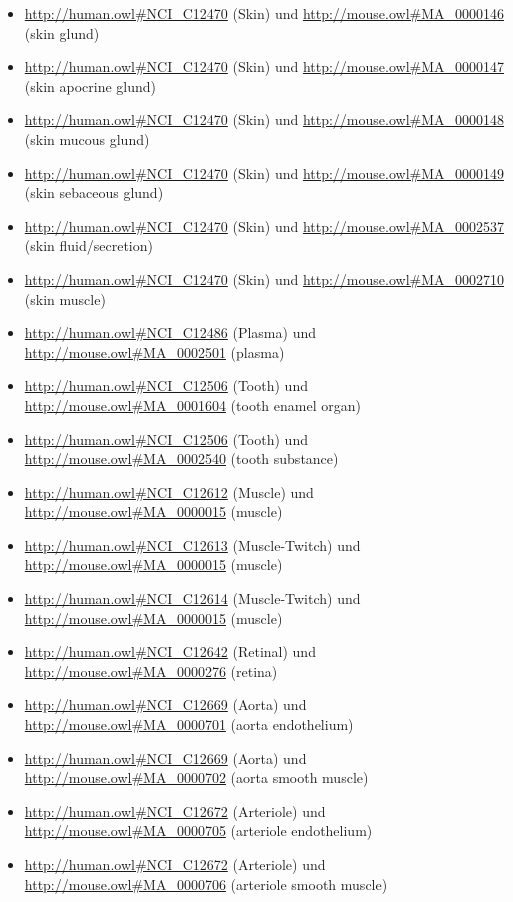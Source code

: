 \begin{itemize}
	\item \url{http://human.owl#NCI_C12470} (Skin) und \url{http://mouse.owl#MA_0000146} (skin glund)
	\item \url{http://human.owl#NCI_C12470} (Skin) und \url{http://mouse.owl#MA_0000147} (skin apocrine glund)
	\item \url{http://human.owl#NCI_C12470} (Skin) und \url{http://mouse.owl#MA_0000148} (skin mucous glund)
	\item \url{http://human.owl#NCI_C12470} (Skin) und \url{http://mouse.owl#MA_0000149} (skin sebaceous glund)
	\item \url{http://human.owl#NCI_C12470} (Skin) und \url{http://mouse.owl#MA_0002537} (skin fluid/secretion)
	\item \url{http://human.owl#NCI_C12470} (Skin) und \url{http://mouse.owl#MA_0002710} (skin muscle)
	\item \url{http://human.owl#NCI_C12486} (Plasma\textunderscoreCell) und \url{http://mouse.owl#MA_0002501} (plasma)
	\item \url{http://human.owl#NCI_C12506} (Tooth) und \url{http://mouse.owl#MA_0001604} (tooth enamel organ)
	\item \url{http://human.owl#NCI_C12506} (Tooth) und \url{http://mouse.owl#MA_0002540} (tooth substance)
	\item \url{http://human.owl#NCI_C12612} (Muscle\textunderscoreCell) und \url{http://mouse.owl#MA_0000015} (muscle)
	\item \url{http://human.owl#NCI_C12613} (Muscle\textunderscoreFibers\textunderscoreFast-Twitch) und \url{http://mouse.owl#MA_0000015} (muscle)
	\item \url{http://human.owl#NCI_C12614} (Muscle\textunderscoreFibers\textunderscoreSlow-Twitch) und \url{http://mouse.owl#MA_0000015} (muscle)
	\item \url{http://human.owl#NCI_C12642} (Retinal\textunderscoreGanglion\textunderscoreCell) und \url{http://mouse.owl#MA_0000276} (retina)
	\item \url{http://human.owl#NCI_C12669} (Aorta) und \url{http://mouse.owl#MA_0000701} (aorta endothelium)
	\item \url{http://human.owl#NCI_C12669} (Aorta) und \url{http://mouse.owl#MA_0000702} (aorta smooth muscle)
	\item \url{http://human.owl#NCI_C12672} (Arteriole) und \url{http://mouse.owl#MA_0000705} (arteriole endothelium)
	\item \url{http://human.owl#NCI_C12672} (Arteriole) und \url{http://mouse.owl#MA_0000706} (arteriole smooth muscle)

\end{itemize}
